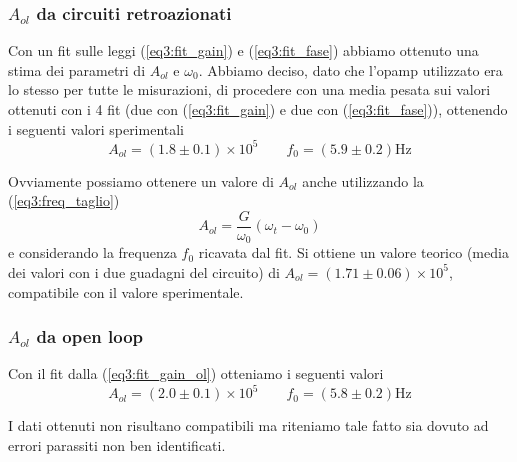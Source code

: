 \subsubsection{$A_{ol}$ da circuiti retroazionati}

Con un fit sulle leggi (\ref{eq3:fit_gain}) e (\ref{eq3:fit_fase}) abbiamo ottenuto una stima dei parametri di $A_{ol}$ e $\omega_0$. Abbiamo deciso, dato che l'opamp utilizzato era lo stesso per tutte le misurazioni, di procedere con una media pesata sui valori ottenuti con i 4 fit (due con (\ref{eq3:fit_gain}) e due con (\ref{eq3:fit_fase})), ottenendo i seguenti valori sperimentali
$$A_{ol}=(1.8\pm0.1)\times 10^5 \qquad f_0=(5.9\pm0.2)\si{\hertz}$$

Ovviamente possiamo ottenere un valore di $A_{ol}$ anche utilizzando la (\ref{eq3:freq_taglio})
$$A_{ol} = \frac{G}{\omega_0} (\omega_t - \omega_0)$$
e considerando la frequenza $f_0$ ricavata dal fit. Si ottiene un valore teorico (media dei valori con i due guadagni del circuito) di $A_{ol} = (1.71\pm 0.06)\times 10^5$, compatibile con il valore sperimentale.

\subsubsection{$A_{ol}$ da open loop}

Con il fit dalla (\ref{eq3:fit_gain_ol}) otteniamo i seguenti valori
$$A_{ol}=(2.0\pm0.1)\times 10^5 \qquad f_0=(5.8\pm0.2)\si{\hertz}$$

I dati ottenuti non risultano compatibili ma riteniamo tale fatto sia dovuto ad errori parassiti non ben identificati.